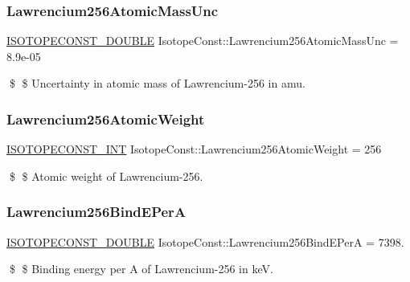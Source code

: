 \subsubsection{\texorpdfstring{Lawrencium256\+Atomic\+Mass\+Unc}{Lawrencium256AtomicMassUnc}}
{\footnotesize\ttfamily \mbox{\hyperlink{group___isotope_const-_macros_ga8f45a7272ce02c0b4c65c44636ed719a}{I\+S\+O\+T\+O\+P\+E\+C\+O\+N\+S\+T\+\_\+\+D\+O\+U\+B\+LE}} Isotope\+Const\+::\+Lawrencium256\+Atomic\+Mass\+Unc = 8.\+9e-\/05}

\$ \$ Uncertainty in atomic mass of Lawrencium-\/256 in amu. \mbox{\label{group___isotope_const-_lawrencium-_lr256_ga0ece26d2b75bb52c193031a75b53d9b1}} 
\subsubsection{\texorpdfstring{Lawrencium256\+Atomic\+Weight}{Lawrencium256AtomicWeight}}
{\footnotesize\ttfamily \mbox{\hyperlink{group___isotope_const-_macros_ga5f18360b3e99483a35c32d789e62621c}{I\+S\+O\+T\+O\+P\+E\+C\+O\+N\+S\+T\+\_\+\+I\+NT}} Isotope\+Const\+::\+Lawrencium256\+Atomic\+Weight = 256}

\$ \$ Atomic weight of Lawrencium-\/256. \mbox{\label{group___isotope_const-_lawrencium-_lr256_ga64078b076018c5d4d9377933256d8b4f}} 
\subsubsection{\texorpdfstring{Lawrencium256\+Bind\+E\+PerA}{Lawrencium256BindEPerA}}
{\footnotesize\ttfamily \mbox{\hyperlink{group___isotope_const-_macros_ga8f45a7272ce02c0b4c65c44636ed719a}{I\+S\+O\+T\+O\+P\+E\+C\+O\+N\+S\+T\+\_\+\+D\+O\+U\+B\+LE}} Isotope\+Const\+::\+Lawrencium256\+Bind\+E\+PerA = 7398.}

\$ \$ Binding energy per A of Lawrencium-\/256 in keV. \mbox{\label{group___isotope_const-_lawrencium-_lr256_gaf849d026627cd71b18c0bd2d336a988a}} 
